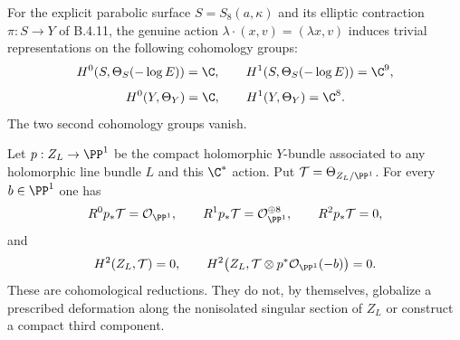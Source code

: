 \begin{proposition}\label{push:src:B.4.14}
For the explicit parabolic surface $S=S_8(a,\kappa)$ and its
elliptic contraction $\pi:S\to Y$ of B.4.11, the genuine action
$\lambda\cdot(x,v)=(\lambda x,v)$ induces trivial representations
on the following cohomology groups:
\[
 H^0(S,\Theta_S(-\log E))=\C,\qquad
 H^1(S,\Theta_S(-\log E))=\C^9,
\]
\[
 H^0(Y,\Theta_Y)=\C,\qquad H^1(Y,\Theta_Y)=\C^8.
\]
The two second cohomology groups vanish.

Let $p:Z_L\to\PP^1$ be the compact holomorphic $Y$-bundle
associated to any holomorphic line bundle $L$ and this
$\C^*$ action.  Put
$\mathcal T=\Theta_{Z_L/\PP^1}$.
For every $b\in\PP^1$ one has
\[
 R^0p_*\mathcal T=\mathcal O_{\PP^1},\qquad
 R^1p_*\mathcal T=\mathcal O_{\PP^1}^{\oplus8},\qquad
 R^2p_*\mathcal T=0,
\]
and
\[
 H^2(Z_L,\mathcal T)=0,
 \qquad
 H^2\bigl(Z_L,\mathcal T\otimes
                   p^*\mathcal O_{\PP^1}(-b)\bigr)=0.
\]
These are cohomological reductions.  They do not, by themselves,
globalize a prescribed deformation along the nonisolated
singular section of $Z_L$ or construct a compact third component.
\end{proposition}
